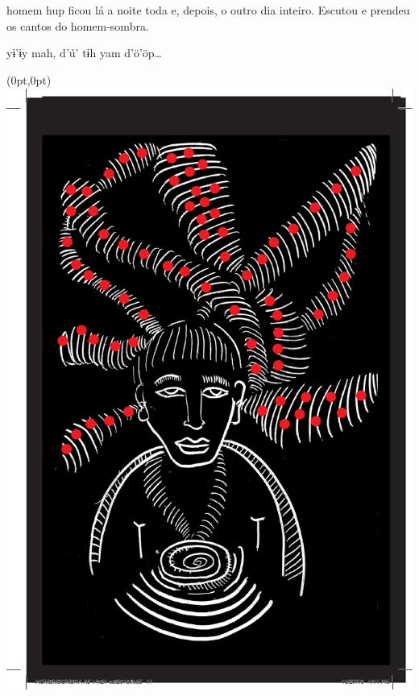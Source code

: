 \chapter*{}

\mbox{}\vspace*{\fill}

 homem hup ficou
lá a noite toda e,
depois, o outro dia
inteiro. Escutou e
prendeu os cantos
do homem-sombra.

\vspace{2em}

 yɨ’ɨy mah,
d’ú’ tɨh yam d’ö’öp\ldots{}

\vspace*{\fill}

\pagebreak

\begin{textblock*}{8in}(0pt,0pt)%
\vspace*{-2.8cm}
\hspace*{-3cm}\includegraphics[width=148mm]{./imgs/img4.pdf}
\end{textblock*}

